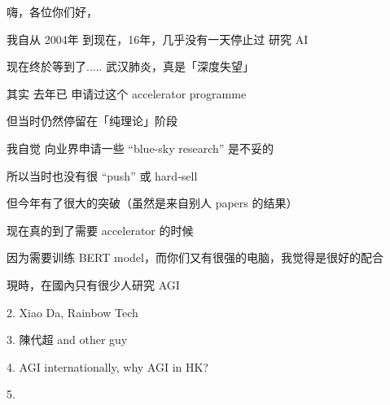 \documentclass[10pt,a4paper]{altacv}
\newcommand{\br}{\vspace*{0.4cm}}
\begin{document}
\clearpage


嗨，各位你们好，

\br

我自从 2004年 到现在，16年，几乎没有一天停止过 研究 AI

现在终於等到了..... 武汉肺炎，真是「深度失望」

\br

其实 去年已 申请过这个 accelerator programme

但当时仍然停留在「纯理论」阶段

我自觉 向业界申请一些 ``blue-sky research'' 是不妥的

所以当时也没有很 ``push'' 或 hard-sell 

但今年有了很大的突破（虽然是来自别人 papers 的结果）

现在真的到了需要 accelerator 的时候 

因为需要训练 BERT model，而你们又有很强的电脑，我觉得是很好的配合

\br

現時，在國內只有很少人研究 AGI

2. Xiao Da, Rainbow Tech

3. 陳代超  and other guy

4. AGI internationally, why AGI in HK?


5. 

\end{document}
